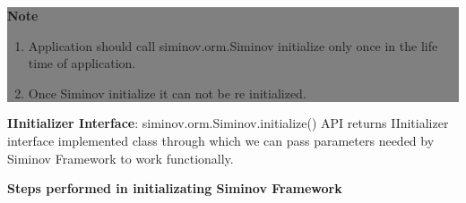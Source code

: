 		\begin{center}
			\colorbox{grey}{
				\parbox[t]{.8\linewidth}{
					\fontsize{11pt}{11pt}\selectfont %
					\vspace*{0.1cm} %
		
					\hfill \textbf{Note} \\

					\begin{enumerate}

						\item \small Application should call siminov.orm.Siminov initialize only once in the life time of application.

						\item \small Once Siminov initialize it can not be re initialized.

					\end{enumerate}

					\vspace*{0.0cm} %
				}
			}

		\end{center}


\par
\textbf{IInitializer Interface}: 
siminov.orm.Siminov.initialize() API returns IInitializer interface implemented class through which we can pass parameters needed by Siminov Framework to work functionally. 

	


\par
\textbf{Steps performed in initializating Siminov Framework}

